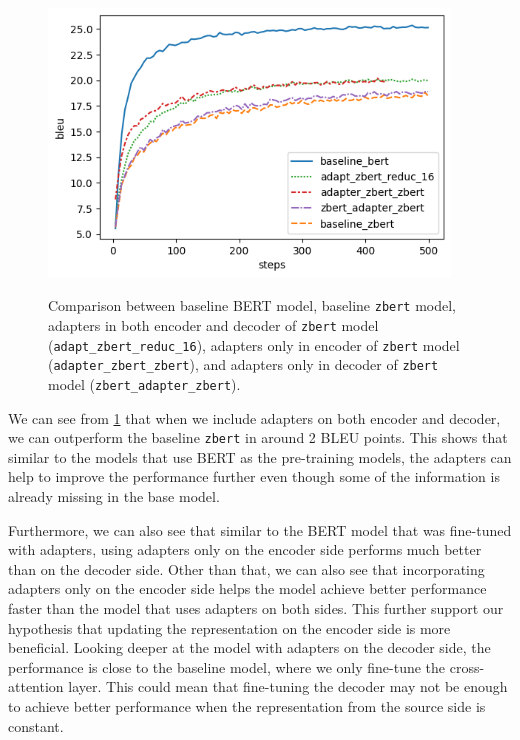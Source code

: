 \begin{figure}[h]
    {\includegraphics[width=0.95\textwidth]{img/zbert_pos.png}}
    \centering
    \caption{Comparison between baseline BERT model, baseline \texttt{zbert} model, adapters in both encoder and decoder of \texttt{zbert} model (\texttt{adapt\_zbert\_reduc\_16}), adapters only in encoder of \texttt{zbert} model (\texttt{adapter\_zbert\_zbert}), and adapters only in decoder of \texttt{zbert} model (\texttt{zbert\_adapter\_zbert}).}
    \label{img:zbert_pos}
\end{figure}

We can see from \cref{img:zbert_pos} that when we include adapters on both encoder and decoder, we can outperform the baseline \texttt{zbert} in around 2 BLEU points. This shows that similar to the models that use BERT as the pre-training models, the adapters can help to improve the performance further even though some of the information is already missing in the base model.

Furthermore, we can also see that similar to the BERT model that was fine-tuned with adapters, using adapters only on the encoder side performs much better than on the decoder side. Other than that, we can also see that incorporating adapters only on the encoder side helps the model achieve better performance faster than the model that uses adapters on both sides. This further support our hypothesis that updating the representation on the encoder side is more beneficial. Looking deeper at the model with adapters on the decoder side, the performance is close to the baseline model, where we only fine-tune the cross-attention layer. This could mean that fine-tuning the decoder may not be enough to achieve better performance when the representation from the source side is constant.

